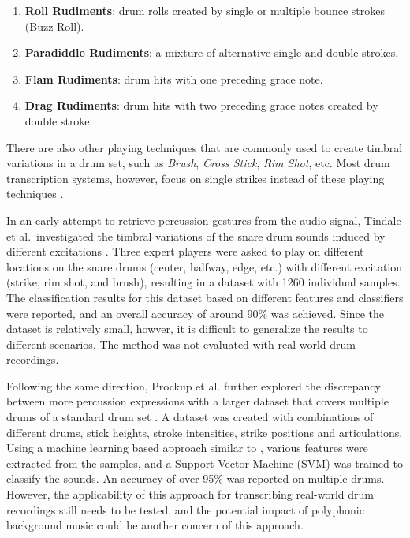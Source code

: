 \documentclass{article}
\begin{document}
\begin{enumerate}
	\item \textbf{Roll Rudiments}: drum rolls created by single or multiple bounce strokes (Buzz Roll).
	\item \textbf{Paradiddle Rudiments}: a mixture of alternative single and double strokes. 
	\item \textbf{Flam Rudiments}: drum hits with one preceding grace note.
	\item \textbf{Drag Rudiments}: drum hits with two preceding grace notes created by double stroke.
\end{enumerate}

There are also other playing techniques that are commonly used to create timbral variations in a drum set, such as \textit{Brush}, \textit{Cross Stick}, \textit{Rim Shot}, etc. Most drum transcription systems, however, focus on single strikes instead of these playing techniques \cite{Benetos2014, Dittmar2014, Thompson2014, Roebel2015, Wu2015a}. 

In an early attempt to retrieve percussion gestures from the audio signal, Tindale et al.~investigated the timbral variations of the snare drum sounds induced by different excitations \cite{Tindale2004}. Three expert players were asked to play on different locations on the snare drums (center, halfway, edge, etc.) with different excitation (strike, rim shot, and brush), resulting in a dataset with 1260 individual samples. The classification results for this dataset based on different features and classifiers  {\color{red}{elaborate on features and classifiers?}} were reported, and an overall accuracy of around 90\% was achieved. Since the dataset is relatively small, howver, it is difficult to generalize the results to different scenarios. The method was not evaluated with real-world drum recordings. {\color{red}{maybe combine summary with following paper?}}

Following the same direction, Prockup et al. further explored the discrepancy between more percussion expressions {\color{red}{now is it gestures or technique or expression?}} with a larger dataset that covers multiple drums of a standard drum set \cite{Prockup2013}. A dataset was created with combinations of different drums, stick heights, stroke intensities, strike positions and articulations. Using a machine learning based approach similar to \cite{Tindale2004}, various features were extracted from the samples, and a Support Vector Machine (SVM) was trained to classify the sounds. An accuracy of over 95\% was reported on multiple drums{\color{red}{more specifics? How many classes, what features}}. However, the applicability of this approach for transcribing real-world drum recordings still needs to be tested, and the potential impact of polyphonic background music could be another concern of this approach.
 
\end{document}
